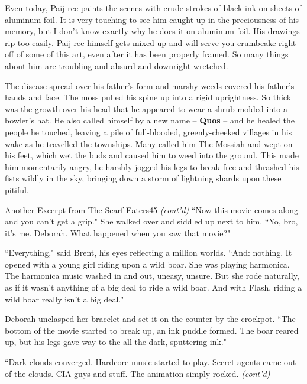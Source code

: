 \documentclass[10pt,twoside]{report}
\begin{document}
Even today, Paij-ree paints the scenes with crude strokes of black ink
on sheets of aluminum foil.  It is very touching to see him caught up
in the preciousness of his memory, but I don't know exactly why he
does it on aluminum foil.  His drawings rip too easily.  Paij-ree
himself gets mixed up and will serve you crumbcake right off of some
of this art, even after it has been properly framed.  So many things
about him are troubling and absurd and downright wretched.

The disease spread over his father's form and marshy weeds covered his
father's hands and face.  The moss pulled his spine up into a rigid
uprightness.  So thick was the growth over his head that he appeared
to wear a shrub molded into a bowler's hat.  He also called himself by
a new name -- {\bf Quos} -- and he healed the people he touched,
leaving a pile of full-blooded, greenly-cheeked villages in his wake
as he travelled the townships.  Many called him The Mossiah and wept
on his feet, which wet the buds and caused him to weed into the
ground.  This made him momentarily angry, he harshly jogged his legs
to break free and thrashed his fists wildly in the sky, bringing down
a storm of lightning shards upon these pitiful.

	\begin{sidebar}{Another Excerpt from The Scarf Eaters}{45}
		\textit{(cont'd)} ``Now this movie comes along and you can't get a grip." She walked over and siddled up next to him. ``Yo, bro, it's me. Deborah. What happened when you saw that movie?"\vspace{6pt}
		
		``Everything," said Brent, his eyes reflecting a million worlds. ``And: nothing. It opened with a young girl riding upon a wild boar. She was playing harmonica. The harmonica music washed in and out, uneasy, unsure. But she rode naturally, as if it wasn't anything of a big deal to ride a wild boar. And with Flash, riding a wild boar really isn't a big deal."\vspace{6pt}

		Deborah unclasped her bracelet and set it on the counter by the crockpot.
		``The bottom of the movie started to break up, an ink puddle formed. The boar reared up, but his legs gave way to the all the dark, sputtering ink."\vspace{6pt}

		``Dark clouds converged. Hardcore music started to play. Secret agents came out of the clouds. CIA guys and stuff. The animation simply rocked. \textit{(cont'd)}
	\end{sidebar}
\end{document}
